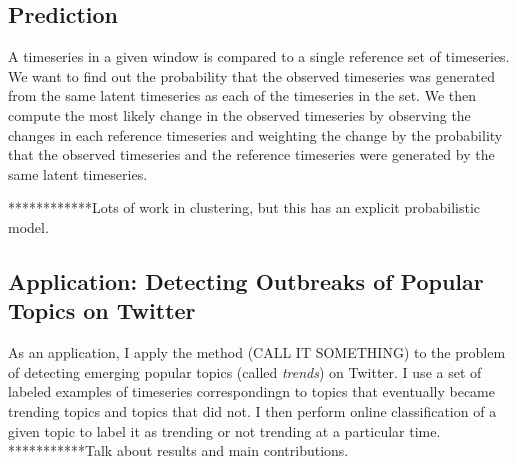 \subsection{Prediction} A timeseries in a given window is compared to a single reference set of timeseries. We want to find out the probability that the observed timeseries was generated from the same latent timeseries as each of the timeseries in the set. We then compute the most likely change in the observed timeseries by observing the changes in each reference timeseries and weighting the change by the probability that the observed timeseries and the reference timeseries were generated by the same latent timeseries.
 
************Lots of work in clustering, but this has an explicit probabilistic model.

\subsection{Application: Detecting Outbreaks of Popular Topics on Twitter}
As an application, I apply the method (CALL IT SOMETHING) to the problem of detecting emerging popular topics (called {\em trends}) on Twitter. I use a set of labeled examples of timeseries correspondingn to topics that eventually became trending topics and topics that did not. I then perform online classification of a given topic to label it as trending or not trending at a particular time.
***********Talk about results and main contributions.
